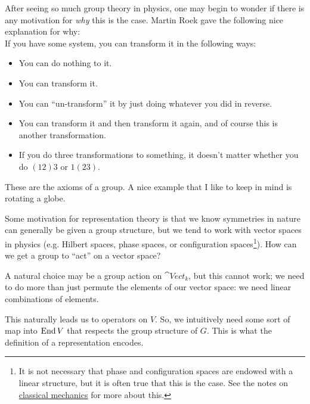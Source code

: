 \documentclass[11pt]{article}
\begin{document}
\begin{reemark}
    After seeing so much group theory in physics, one may begin to
    wonder if there is any motivation for \emph{why} this is the case.
    Martin Roek gave the following nice explanation for why:\\
    
    \noin
    If you have some system, you can transform it in the following
    ways:
    \begin{itemize}
        \item You can do nothing to it.
        \item You can transform it.
        \item You can ``un-transform'' it by just doing whatever you did
        in reverse.
        \item You can transform it and then transform it again,
        and of course this is another transformation.
        \item If you do three transformations to something,
        it doesn't matter whether you do $(12)3$ or $1(23)$.
    \end{itemize}
    These are the axioms of a group. A nice example that I like
    to keep in mind is rotating a globe.
\end{reemark}

Some motivation for representation theory is that we
know symmetries in nature can generally be given a group structure,
but we tend to work with vector spaces in physics (e.g. Hilbert
spaces, phase spaces, or configuration spaces\footnote{It is
not necessary that phase and configuration spaces are endowed with a linear
structure, but it is often true that this is the case.
See the notes on 
\href{https://github.com/will-lancer/notes/blob/main/Physics/Four_Mechanics/FourMechanics.pdf}{classical mechanics} 
for more about this.}).
How can we get a group to ``act'' on a vector space?

A natural choice may be a group action on $\cat{Vect}_k$, 
but this cannot work; we need to do more than just permute the elements
of our vector space: we need linear combinations of elements.


This naturally leads us to operators on $V$. So, we intuitively
need some sort of map into $\operatorname{End}{V}$ that respects the group
structure of $G$. This is what the definition of a representation
encodes.
\end{document}
